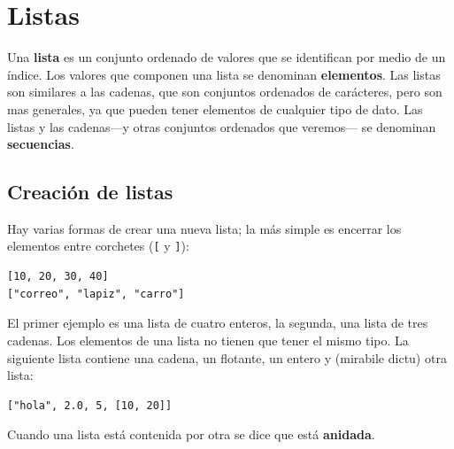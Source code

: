 


\chapter{Listas}

Una {\bf lista} es un conjunto ordenado de valores que se identifican
por medio de un índice.  Los valores que componen una lista se 
denominan  {\bf elementos}. Las listas son similares a las cadenas, 
que son conjuntos ordenados de carácteres, pero son mas generales, ya
que pueden tener elementos de cualquier tipo de dato. Las listas y 
las cadenas---y otras conjuntos ordenados que veremos--- se denominan 
{\bf secuencias}.


\section{Creación de listas}

Hay varias formas de crear una nueva lista; la más simple es
encerrar los elementos entre corchetes (\verb+[+ y \verb+]+):

\beforeverb
\begin{verbatim}
[10, 20, 30, 40]
["correo", "lapiz", "carro"]
\end{verbatim}
\afterverb
%
El primer ejemplo es una lista de cuatro enteros, la segunda, una
lista de tres cadenas. Los elementos de una lista no tienen que
tener el mismo tipo. La siguiente lista contiene una cadena, un 
flotante, un entero y (mirabile dictu) otra lista:

\beforeverb
\begin{verbatim}
["hola", 2.0, 5, [10, 20]]
\end{verbatim}
\afterverb
%
Cuando una lista está contenida por  otra  se dice que está {\bf anidada}.

